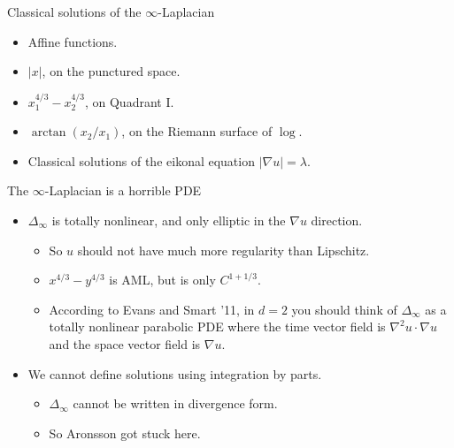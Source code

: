 \documentclass[10pt]{beamer}
\begin{document}
\begin{frame}{Classical solutions of the $\infty$-Laplacian}
\begin{itemize}
\item Affine functions.
\item $|x|$, on the punctured space.
\item $x_1^{4/3} - x_2^{4/3}$, on Quadrant I.
\item $\arctan(x_2/x_1)$, on the Riemann surface of $\log$.
\item Classical solutions of the eikonal equation $|\nabla u| = \lambda$.
\end{itemize}
\end{frame}

\begin{frame}{The $\infty$-Laplacian is a horrible PDE}
\begin{itemize}
\item $\Delta_\infty$ is totally nonlinear, and only elliptic in the $\nabla u$ direction.  
\begin{itemize}
\item So $u$ should not have much more regularity than Lipschitz. 
\item $x^{4/3} - y^{4/3}$ is AML, but is only $C^{1 + 1/3}$. 
\item According to Evans and Smart '11, in $d = 2$ you should think of $\Delta_\infty$ as a totally nonlinear parabolic PDE where the time vector field is $\nabla^2 u \cdot \nabla u$ and the space vector field is $\nabla u$. 
\end{itemize}
\item We cannot define solutions using integration by parts. 
\begin{itemize}
\item $\Delta_\infty$ cannot be written in divergence form. 
\item So Aronsson got stuck here.
\end{itemize}
\end{itemize}
\end{frame}
\end{document}
